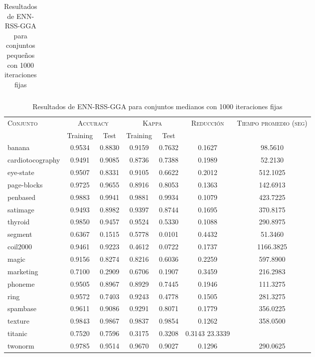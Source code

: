 \begin{table}[]
\begin{tabular}{l c c c c c c}
\hline
\end{tabular}
\caption{Resultados de ENN-RSS-GGA para conjuntos pequeños con 1000 iteraciones fijas}
\label{res-peq-enn-rss-gga}
\end{table}



\begin{table}[]
\centering
\begin{tabular}{l c c c c c c}
\hline
\multirow{2}{*}{\textsc{Conjunto}}
	& \multicolumn{2}{c}{\textsc{Accuracy}}
	& \multicolumn{2}{c}{\textsc{Kappa}}
	& \textsc{Reducción}
	& \textsc{Tiempo promedio (seg)} \\
	& Training & Test
	& Training & Test \\ 
\hline
\hline

banana & 0.9534 & 0.8830 & 0.9159 & 0.7632 & 0.1627 & 98.5610 \\
cardiotocography & 0.9491 & 0.9085 & 0.8736 & 0.7388 & 0.1989 & 52.2130 \\
eye-state & 0.9507 & 0.8331 & 0.9105 & 0.6622 & 0.2012 &  512.1025 \\
page-blocks & 0.9725 & 0.9655 & 0.8916 & 0.8053 & 0.1363 & 142.6913 \\
penbased & 0.9883 & 0.9941 & 0.9881 & 0.9934 & 0.1079 &  423.7225 \\
satimage & 0.9493 & 0.8982 & 0.9397 & 0.8744 & 0.1695 &  370.8175 \\
thyroid & 0.9850 & 0.9457 & 0.9524 & 0.5330 & 0.1088 &  290.8975 \\
segment & 0.6367 & 0.1515 & 0.5778 & 0.0101 & 0.4432 & 51.3460 \\
coil2000 & 0.9461 & 0.9223 & 0.4612 & 0.0722 & 0.1737 &  1166.3825 \\
magic & 0.9156 & 0.8274 & 0.8216 & 0.6036 & 0.2259 &  597.8900 \\
marketing & 0.7100 & 0.2909 & 0.6706 & 0.1907 & 0.3459 & 216.2983 \\
phoneme & 0.9505 & 0.8967 & 0.8929 & 0.7445 & 0.1946 & 111.3275 \\
ring & 0.9572 & 0.7403 & 0.9243 & 0.4778 & 0.1505 &  281.3275 \\
spambase & 0.9611 & 0.9086 & 0.9291 & 0.8071 & 0.1779 &  356.0225 \\
texture & 0.9843 & 0.9867 & 0.9837 & 0.9854 & 0.1262 &  358.0500 \\
titanic & 0.7520 & 0.7596 & 0.3175 & 0.3208 & 0.3143  23.3339 \\
twonorm & 0.9785 & 0.9514 & 0.9670 & 0.9027 & 0.1296 &  290.0625 \\

\hline
\end{tabular}
\caption{Resultados de ENN-RSS-GGA para conjuntos medianos con 1000 iteraciones fijas}
\label{res-med-enn-rss-gga}
\end{table}



